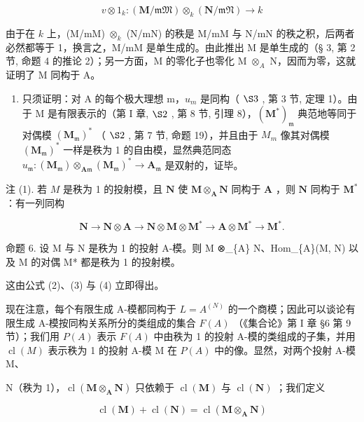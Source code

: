 \[
v \otimes 1 _ {k} \colon (\mathbf {M} / \mathfrak {m M}) \otimes_ {k} (\mathbf {N} / \mathfrak {m N}) \rightarrow k
\]

由于在 \(k\) 上，(M/mM) \(\otimes_k\) (N/mN) 的秩是 M/mM 与 N/mN 的秩之积，后两者必然都等于 1，换言之，M/mM 是单生成的。由此推出 M 是单生成的（§ 3, 第 2 节, 命题 4 的推论 2）；另一方面，M 的零化子也零化 M \(\otimes_A\) N，因而为零，这就证明了 M 同构于 A。

\begin{enumerate}
\def\labelenumi{(\roman{enumi})}
\setcounter{enumi}{1}
\tightlist
\item
  只须证明：对 A 的每个极大理想 m，\(u_{m}\) 是同构（ \(\S 3\) , 第 3 节, 定理 1）。由于 M 是有限表示的（第 I 章, \(\S 2\) , 第 8 节, 引理 8），\((\mathbf{M}^{*})_{\mathfrak{m}}\) 典范地等同于对偶模 \((\mathbf{M}_{\mathfrak{m}})^{*}\) （ \(\S 2\) , 第 7 节, 命题 19），并且由于 \(M_{m}\) 像其对偶模 \((\mathbf{M}_{\mathfrak{m}})^{*}\) 一样是秩为 1 的自由模，显然典范同态 \(u_{\mathfrak{m}}: (\mathbf{M}_{\mathfrak{m}}) \otimes_{\mathbf{A}\mathfrak{m}} (\mathbf{M}_{\mathfrak{m}})^{*} \to \mathbf{A}_{\mathfrak{m}}\) 是双射的，证毕。
\end{enumerate}

注 (1). 若 \(M\) 是秩为 1 的投射模，且 \(\mathbf{N}\) 使 \(\mathbf{M} \otimes_{\mathbf{A}} \mathbf{N}\) 同构于 \(\mathbf{A}\) ，则 \(\mathbf{N}\) 同构于 \(\mathbf{M}^*\) ：有一列同构

\[
\mathbf {N} \rightarrow \mathbf {N} \otimes \mathbf {A} \rightarrow \mathbf {N} \otimes \mathbf {M} \otimes \mathbf {M} ^ {*} \rightarrow \mathbf {A} \otimes \mathbf {M} ^ {*} \rightarrow \mathbf {M} ^ {*}.
\]

命题 6. 设 M 与 N 是秩为 1 的投射 A-模。则 M ⊗\_\{A\} N、Hom\_\{A\}(M, N) 以及 M 的对偶 M* 都是秩为 1 的投射模。

这由公式 (2)、(3) 与 (4) 立即得出。

现在注意，每个有限生成 A-模都同构于 \(L = A^{(N)}\) 的一个商模；因此可以谈论有限生成 A-模按同构关系所分的类组成的集合 \(F(A)\) （《集合论》第 I 章 §6 第 9 节）；我们用 \(P(A)\) 表示 \(F(A)\) 中由秩为 1 的投射 A-模的类组成的子集，并用 \(\operatorname{cl}(M)\) 表示秩为 1 的投射 A-模 M 在 \(P(A)\) 中的像。显然，对两个投射 A-模 M、

N（秩为 1），\(\operatorname{cl}(\mathbf{M} \otimes_{\mathbf{A}} \mathbf{N})\) 只依赖于 \(\operatorname{cl}(\mathbf{M})\) 与 \(\operatorname{cl}(\mathbf{N})\) ；我们定义

\[
\operatorname{cl} (\mathbf {M}) + \operatorname{cl} (\mathbf {N}) = \operatorname{cl} (\mathbf {M} \otimes_ {\mathbf {A}} \mathbf {N})\tag{6}
\]

